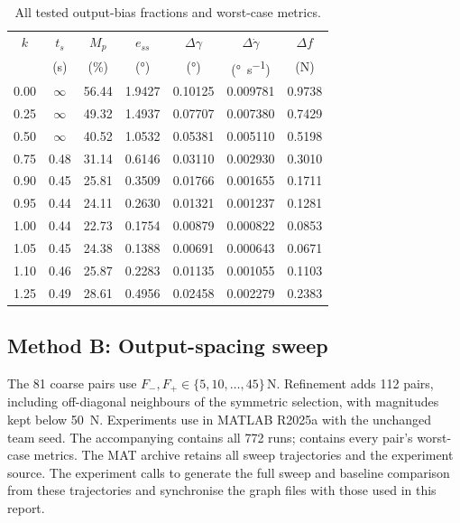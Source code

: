 \documentclass[11pt,a4paper]{article}
\newcommand{\gam}{\ensuremath{\gamma}}
\newcommand{\gamdot}{\ensuremath{\dot{\gamma}}}
\newcommand{\ts}{\ensuremath{t_s}}
\newcommand{\overshoot}{\ensuremath{M_p}}
\newcommand{\sse}{\ensuremath{e_{ss}}}
\begin{document}
\begin{table}[H]
\centering
\small
\begin{tabular}{@{}ccccccc@{}}
\toprule
$k$ & $\ts$ & $\overshoot$ & $\sse$ & $\Delta\gam$ & $\Delta\gamdot$ & $\Delta f$ \\
 & (\si{\s}) & (\si{\%}) & (\si{\degree}) & (\si{\degree}) & (\si{\degree\per\s}) & (\si{\N}) \\
\midrule
0.00 & $\infty$ & 56.44 & 1.9427 & 0.10125 & 0.009781 & 0.9738 \\
0.25 & $\infty$ & 49.32 & 1.4937 & 0.07707 & 0.007380 & 0.7429 \\
0.50 & $\infty$ & 40.52 & 1.0532 & 0.05381 & 0.005110 & 0.5198 \\
0.75 & 0.48 & 31.14 & 0.6146 & 0.03110 & 0.002930 & 0.3010 \\
0.90 & 0.45 & 25.81 & 0.3509 & 0.01766 & 0.001655 & 0.1711 \\
0.95 & 0.44 & 24.11 & 0.2630 & 0.01321 & 0.001237 & 0.1281 \\
1.00 & 0.44 & 22.73 & 0.1754 & 0.00879 & 0.000822 & 0.0853 \\
1.05 & 0.45 & 24.38 & 0.1388 & 0.00691 & 0.000643 & 0.0671 \\
1.10 & 0.46 & 25.87 & 0.2283 & 0.01135 & 0.001055 & 0.1103 \\
1.25 & 0.49 & 28.61 & 0.4956 & 0.02458 & 0.002279 & 0.2383 \\
\bottomrule
\end{tabular}
\caption{All tested output-bias fractions and worst-case metrics.}
\label{tab:method-a-full}
\end{table}

\subsection{Method B: Output-spacing sweep}
\label{app:method-b-data}

The 81 coarse pairs use $F_-,F_+\in\{5,10,\ldots,45\}\,\si{\N}$.
Refinement adds 112 pairs, including off-diagonal neighbours of the symmetric
selection, with magnitudes kept below \SI{50}{\N}. Experiments use
 in MATLAB R2025a with the unchanged team
seed. The accompanying  contains all
772 runs;  contains every pair's
worst-case metrics. The MAT archive retains all sweep trajectories and
the experiment source. The experiment calls
 to generate the full sweep and
baseline comparison from these trajectories and synchronise the graph
files with those used in this report.
\end{document}
